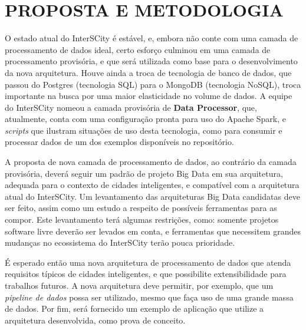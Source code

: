 \section{PROPOSTA E METODOLOGIA}

O estado atual do InterSCity é estável, e, embora não conte com uma camada de
processamento de dados ideal, certo esforço culminou em uma camada de
processamento provisória, e que será utilizada como base para o desenvolvimento
da nova arquitetura. Houve ainda a troca de tecnologia de banco de dados, que
passou do Postgres (tecnologia SQL) para o MongoDB (tecnologia NoSQL), troca
importante na busca por uma maior elasticidade no volume de dados. A equipe do
InterSCity nomeou a camada provisória de \textbf{Data Processor}, que,
atualmente, conta com uma configuração pronta para uso do Apache Spark, e
\textit{scripts} que ilustram situações de uso desta tecnologia, como
para consumir e processar dados de um dos exemplos disponíveis no repositório.

A proposta de nova camada de processamento de dados, ao contrário da camada
provisória, deverá seguir um padrão de projeto Big Data em sua arquitetura,
adequada para o contexto de cidades inteligentes, e compatível com a
arquitetura atual do InterSCity. Um levantamento das arquiteturas Big Data
candidatas deve ser feito, assim como um estudo a respeito de possíveis
ferramentas para as compor. Este levantamento terá algumas restrições, como:
somente projetos software livre deverão ser levados em conta, e ferramentas
que necessitem grandes mudanças no ecossistema do InterSCity terão pouca
prioridade.

É esperado então uma nova arquitetura de processamento de dados que atenda
requisitos típicos de cidades inteligentes, e que possibilite extensibilidade
para trabalhos futuros. A nova arquitetura deve permitir, por exemplo, que um
\textit{pipeline de dados} possa ser utilizado, mesmo que faça uso de uma
grande massa de dados. Por fim, será fornecido um exemplo de aplicação que
utilize a arquitetura desenvolvida, como prova de conceito.
